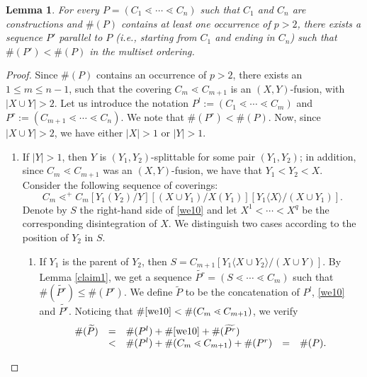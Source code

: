 \documentclass{article}
\theoremstyle{plain}
\newtheorem{lemma}[thm]{Lemma}
\theoremstyle{definition}
\begin{document}
\begin{lemma}\label{claim2} For every $P=(C_1\lessdot \cdots\lessdot C_n)$ such that $C_1$ and $C_n$ are constructions and $\#(P)$ contains at least one occurrence of $p>2$, there exists a sequence $P'$ parallel to $P$ (i.e., starting from $C_1$ and ending in $C_n$) such that $\#(P')<\#(P)$ in the multiset ordering.
\end{lemma}
\begin{proof} %
Since $\#(P)$ contains an occurrence of $p>2$, there exists an $1\leq m\leq n-1$, such that the covering $C_m \lessdot C_{m+1}$ is an $(X,Y)$-fusion, with $|X\cup Y|>2$. Let us introduce the notation $P^l:=(C_1\lessdot \cdots\lessdot C_m)$ and $P^r:=(C_{m+1}\lessdot \cdots\lessdot C_n)$. We note that $\#(P^r)<\#(P)$. Now, since $|X\cup Y|>2$, we have either $|X|>1$ or $|Y|>1$.
\begin{enumerate}
\item If $|Y|>1$, then $Y$ is $(Y_1,Y_2)$-splittable for some pair $(Y_1,Y_2)$; in addition, since $C_m \lessdot C_{m+1}$ was an $(X,Y)$-fusion, we have that $Y_1<Y_2<X$. Consider the following sequence of coverings:
\begin{equation}
C_m \lessdot^+ C_m[Y_1(Y_2)/Y][(X\cup Y_1)/X(Y_1)][Y_1\langle X \rangle/(X\cup Y_1)].
\label{we10}
\end{equation}
Denote by $S$ the right-hand side of \eqref{we10} and let $X^1<\cdots <X^q$ be the corresponding disintegration of $X$. We distinguish two cases according to the position of $Y_2$ in $S$.
\begin{enumerate}
\item If $Y_1$ is the parent of $Y_2$, then $S=C_{m+1}[Y_1\langle X\cup Y_2\rangle/(X\cup Y)]$. By Lemma \ref{claim1}, we get a sequence $\widetilde{P^r}=(S\lessdot \cdots \lessdot C_m)$ such that
$\#(\widetilde{P^r})\leq \#(P^r)$. We define $\widetilde{P}$ to be the concatenation of $P^l$, \eqref{we10} and $\widetilde{P^r}$. Noticing that
$\#\eqref{we10} < \#(C_m\lessdot C_{m+1})$, we verify
$$\begin{array}{lllll}
\#(\widetilde{P}) & = &\#(P^l)+\#\eqref{we10}+\#(\widetilde{P^r}) &&\\
& < & \#(P^l)+\#(C_m\lessdot C_{m+1})+\#(P^r) &=&\#(P).
\end{array}$$


\end{enumerate}
\end{enumerate}
\end{proof}
\end{document}
